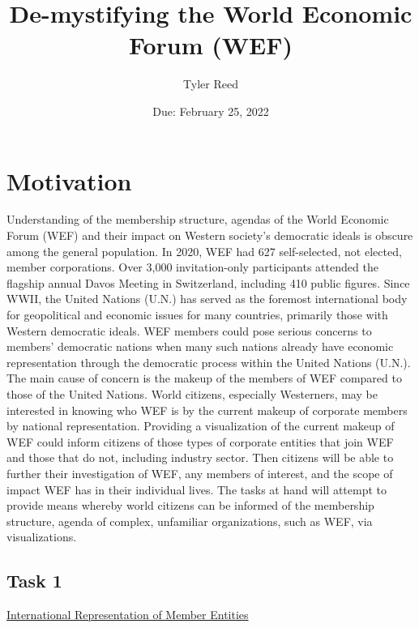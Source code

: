 \documentclass{article}
\title{De-mystifying the World Economic Forum (WEF)}
\author{Tyler Reed }
\date{Due: February 25, 2022}
\begin{document}
\maketitle{}

\section*{Motivation}
Understanding of the membership structure, agendas of the World Economic Forum (WEF) and their impact on Western society's democratic ideals is obscure among the general population. In 2020, WEF had 627 self-selected, not elected, member corporations. Over 3,000 invitation-only participants attended the flagship annual Davos Meeting in Switzerland, including 410 public figures. Since WWII, the United Nations (U.N.) has served as the foremost international body for geopolitical and economic issues for many countries, primarily those with Western democratic ideals. WEF members could pose serious concerns to members' democratic nations when many such nations already have economic representation through the democratic process within the United Nations (U.N.). The main cause of concern is the makeup of the members of WEF compared to those of the United Nations. World citizens, especially Westerners, may be interested in knowing who WEF is by the current makeup of corporate members by national representation. Providing a visualization of the current makeup of WEF could inform citizens of those types of corporate entities that join WEF and those that do not, including industry sector. Then citizens will be able to further their investigation of WEF, any members of interest, and the scope of impact WEF has in their individual lives. The tasks at hand will attempt to provide means whereby world citizens can be informed of the membership structure, agenda of complex, unfamiliar organizations, such as WEF, via visualizations.
\\


\subsection*{Task 1}
\underline{International Representation of Member Entities}
\\
\end{document}
